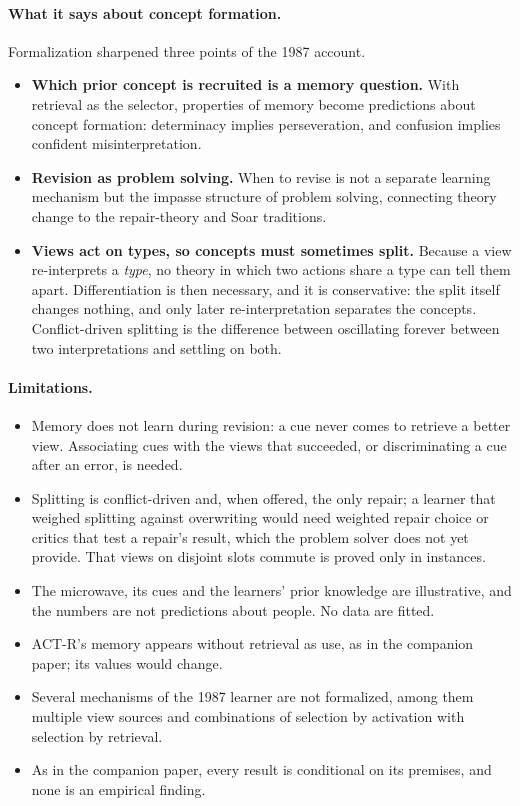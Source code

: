 \documentclass[11pt]{article}
\begin{document}
\paragraph{What it says about concept formation.} Formalization sharpened three points of the 1987 account.
\begin{itemize}
  \item \textbf{Which prior concept is recruited is a memory question.} With retrieval as the selector, properties of memory become predictions about concept formation: determinacy implies perseveration, and confusion implies confident misinterpretation.
  \item \textbf{Revision as problem solving.} When to revise is not a separate learning mechanism but the impasse structure of problem solving, connecting theory change to the repair-theory and Soar traditions.
  \item \textbf{Views act on types, so concepts must sometimes split.} Because a view re-interprets a \emph{type}, no theory in which two actions share a type can tell them apart. Differentiation is then necessary, and it is conservative: the split itself changes nothing, and only later re-interpretation separates the concepts. Conflict-driven splitting is the difference between oscillating forever between two interpretations and settling on both.
\end{itemize}

\paragraph{Limitations.}
\begin{itemize}
  \item Memory does not learn during revision: a cue never comes to retrieve a better view. Associating cues with the views that succeeded, or discriminating a cue after an error, is needed.
  \item Splitting is conflict-driven and, when offered, the only repair; a learner that weighed splitting against overwriting would need weighted repair choice or critics that test a repair's result, which the problem solver does not yet provide. That views on disjoint slots commute is proved only in instances.
  \item The microwave, its cues and the learners' prior knowledge are illustrative, and the numbers are not predictions about people. No data are fitted.
  \item ACT-R's memory appears without retrieval as use, as in the companion paper; its values would change.
  \item Several mechanisms of the 1987 learner are not formalized, among them multiple view sources and combinations of selection by activation with selection by retrieval.
  \item As in the companion paper, every result is conditional on its premises, and none is an empirical finding.
\end{itemize}
\end{document}
